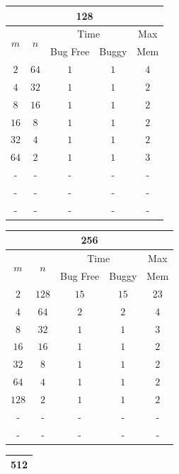 \begin{table}[!h]
{\begin{tabular}{|c|c|c|c|c|}
\hline
\multicolumn{5}{|c|}{128}\\
\hline
\multirow{2}{*}{$m$} &  \multirow{2}{*}{$n$} & \multicolumn{2}{c|}{Time} & Max \\
\hhline{~~--~}
     &      & Bug Free & Buggy & Mem \\
\hline
 $2$ & $64$ &      $1$ &   $1$ & $4$ \\
\hline
 $4$ & $32$ &      $1$ &   $1$ & $2$ \\
\hline
 $8$ & $16$ &      $1$ &   $1$ & $2$ \\
\hline
$16$ &  $8$ &      $1$ &   $1$ & $2$ \\
\hline
$32$ &  $4$ &      $1$ &   $1$ & $2$ \\
\hline
$64$ &  $2$ &      $1$ &   $1$ & $3$ \\
\hline
  -  &   -  &   -      &   -   &  -  \\
\hline
  -  &   -  &   -      &   -   &  -  \\
\hline
  -  &   -  &   -      &   -   &  -  \\
\hline
\end{tabular}
\begin{tabular}{|c|c|c|c|c|}
\hline
\multicolumn{5}{|c|}{256}\\
\hline
\multirow{2}{*}{$m$} &  \multirow{2}{*}{$n$} & \multicolumn{2}{c|}{Time} & Max \\
\hhline{~~--~}
     &        & Bug Free & Buggy & Mem  \\
\hline
  $2$ & $128$ &     $15$ &  $15$ & $23$ \\
\hline
  $4$ &  $64$ &      $2$ &   $2$ &  $4$ \\
\hline
  $8$ &  $32$ &      $1$ &   $1$ &  $3$ \\
\hline
 $16$ &  $16$ &      $1$ &   $1$ &  $2$ \\
\hline
 $32$ &   $8$ &      $1$ &   $1$ &  $2$ \\
\hline
 $64$ &   $4$ &      $1$ &   $1$ &  $2$ \\
\hline
$128$ &   $2$ &      $1$ &   $1$ &  $2$ \\
\hline
  -   &   -   &       -  &    -  &   -  \\
\hline
  -   &   -   &       -  &    -  &   -  \\
\hline
\end{tabular}
\begin{tabular}{|c|c|c|c|c|}
\hline
\multicolumn{5}{|c|}{512}\\
\hline

\end{tabular}}
\end{table}
